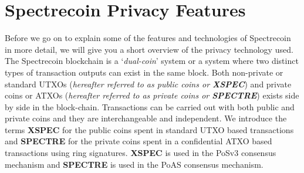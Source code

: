 \section{Spectrecoin Privacy Features}
Before we go on to explain some of the features and technologies of
Spectrecoin in more detail, we will give you a short overview of the
privacy technology used. The Spectrecoin blockchain is a ‘\textit{dual-coin}’
system or a system where two distinct types of transaction outputs can
exist in the same block. Both non-private or standard UTXOs (\textit{hereafter
referred to as public coins or \textbf{XSPEC}}) and private coins or ATXOs 
(\textit{hereafter referred to as private coins or \textbf{SPECTRE}}) exists 
side by side in the block-chain. Transactions can be carried out with both 
public and private coins and they are interchangeable and independent. We 
introduce the terms \textbf{XSPEC} for the public coins spent in standard UTXO based 
transactions and \textbf{SPECTRE} for the private coins spent in a confidential ATXO based
transactions using ring signatures. \textbf{XSPEC} is used in the PoSv3 consensus
mechanism and \textbf{SPECTRE} is used in the PoAS consensus mechanism.



